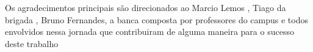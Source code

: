 \begin{agradecimentos}
Os agradecimentos principais são direcionados ao Marcio Lemos , Tiago da brigada , Bruno Fernandes, a banca composta por 
professores do campus e todos envolvidos nessa jornada que contribuiram de alguma maneira para o sucesso deste trabalho


\end{agradecimentos}